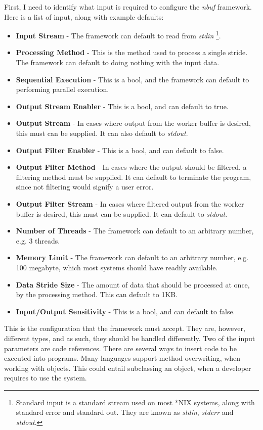 \documentclass[a4paper]{article}
\newcommand{\nbuf}{\textit{nbuf} }
\begin{document}
First, I need to identify what input is required to configure the \nbuf framework. Here is a list of input, along with example defaults:
\begin{itemize}
\item \textbf{Input Stream} - The framework can default to read from \textit{stdin} \footnote{Standard input is a standard stream used on most *NIX systems, along with standard error and standard out. They are known as \textit{stdin}, \textit{stderr} and \textit{stdout}.}.
\item \textbf{Processing Method} - This is the method used to process a single stride. The framework can default to doing nothing with the input data.
\item \textbf{Sequential Execution} - This is a bool, and the framework can default to performing parallel execution.
\item \textbf{Output Stream Enabler} - This is a bool, and can default to true.
\item \textbf{Output Stream} - In cases where output from the worker buffer is desired, this must can be supplied. It can also default to \textit{stdout}.
\item \textbf{Output Filter Enabler} - This is a bool, and can default to false.
\item \textbf{Output Filter Method} - In cases where the output should be filtered, a filtering method must be supplied. It can default to terminate the program, since not filtering would signify a user error.
\item \textbf{Output Filter Stream} - In cases where filtered output from the worker buffer is desired, this must can be supplied. It can default to \textit{stdout}.
\item \textbf{Number of Threads} - The framework can default to an arbitrary number, e.g. 3 threads.
\item \textbf{Memory Limit} - The framework can default to an arbitrary number, e.g. 100 megabyte, which most systems should have readily available.
\item \textbf{Data Stride Size} - The amount of data that should be processed at once, by the processing method. This can default to 1KB.
\item \textbf{Input/Output Sensitivity} - This is a bool, and can default to false.
\end{itemize}

This is the configuration that the framework must accept. They are, however, different types, and as such, they should be handled differently. Two of the input parameters are code references. There are several ways to insert code to be executed into programs. Many languages support method-overwriting, when working with objects. This could entail subclassing an object, when a developer requires to use the system. 
\end{document}
